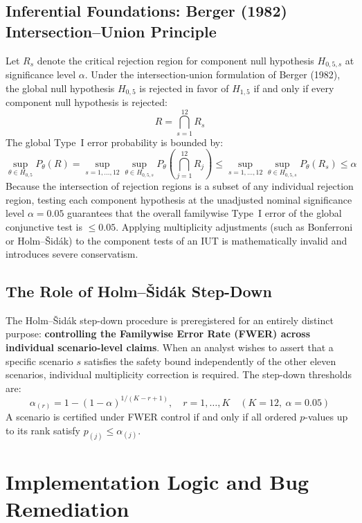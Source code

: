 \documentclass[10pt,a4paper]{article}
\begin{document}
\subsection{Inferential Foundations: Berger (1982) Intersection--Union Principle}
Let $R_s$ denote the critical rejection region for component null hypothesis $H_{0,5,s}$ at significance level $\alpha$. Under the intersection-union formulation of Berger (1982), the global null hypothesis $H_{0,5}$ is rejected in favor of $H_{1,5}$ if and only if every component null hypothesis is rejected:
\begin{equation}
R = \bigcap_{s=1}^{12} R_s
\end{equation}
The global Type~I error probability is bounded by:
\begin{equation}
\sup_{\theta \in H_{0,5}} P_\theta(R) = \sup_{s=1,\dots,12} \sup_{\theta \in H_{0,5,s}} P_\theta\left(\bigcap_{j=1}^{12} R_j\right) \le \sup_{s=1,\dots,12} \sup_{\theta \in H_{0,5,s}} P_\theta(R_s) \le \alpha
\end{equation}
Because the intersection of rejection regions is a subset of any individual rejection region, testing each component hypothesis at the unadjusted nominal significance level $\alpha = 0.05$ guarantees that the overall familywise Type~I error of the global conjunctive test is $\le 0.05$. Applying multiplicity adjustments (such as Bonferroni or Holm--Šidák) to the component tests of an IUT is mathematically invalid and introduces severe conservatism.

\subsection{The Role of Holm--Šidák Step-Down}
The Holm--Šidák step-down procedure is preregistered for an entirely distinct purpose: \textbf{controlling the Familywise Error Rate (FWER) across individual scenario-level claims}. When an analyst wishes to assert that a specific scenario $s$ satisfies the safety bound independently of the other eleven scenarios, individual multiplicity correction is required. The step-down thresholds are:
\begin{equation}
\alpha_{(r)} = 1 - (1 - \alpha)^{1 / (K - r + 1)}, \quad r = 1, \dots, K \quad (K = 12, \ \alpha = 0.05)
\end{equation}
A scenario is certified under FWER control if and only if all ordered $p$-values up to its rank satisfy $p_{(j)} \le \alpha_{(j)}$.

\section{Implementation Logic and Bug Remediation}
\end{document}
